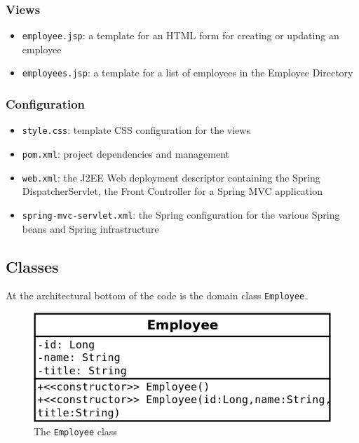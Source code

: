\documentclass{article}
\begin{document}
\subsubsection{Views}
\begin{itemize}
\item \texttt{employee.jsp}: a template for an HTML form for creating or updating an employee
\item \texttt{employees.jsp}: a template for a list of employees in the Employee Directory
\end{itemize}

\subsubsection{Configuration}
\begin{itemize}
\item \texttt{style.css}: template CSS configuration for the views
\item \texttt{pom.xml}: project dependencies and management
\item \texttt{web.xml}: the J2EE Web deployment descriptor containing the Spring DispatcherServlet, the Front Controller for a Spring MVC application
\item \texttt{spring-mvc-servlet.xml}: the Spring configuration for the various Spring beans and Spring infrastructure
\end{itemize}

\subsection{Classes}

At the architectural bottom of the code is the domain class \texttt{Employee}.

\vspace{10pt}
\begin{figure}[H]
\begin{center}
\includegraphics[scale=0.5]{images/core/class-Employee.png}
\end{center}
\caption{The \texttt{Employee} class}
\label{fig:core/Employee}
\end{figure}
\end{document}

